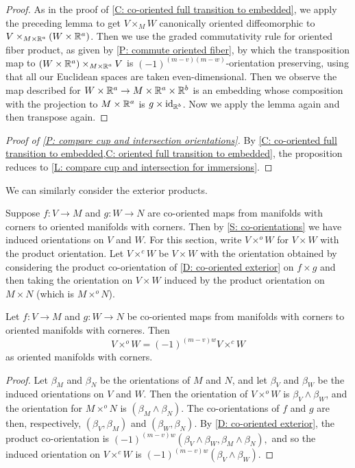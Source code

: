 \begin{proof}
	As in the proof of \cref{C: co-oriented full transition to embedded},
	we apply the preceding lemma to get $V \times_M W$ canonically oriented diffeomorphic to $V\times_{M \times \mathbb{R}^a }(W \times \mathbb{R}^a )$.
	Then we use the graded commutativity rule for oriented fiber product, as given by \cref{P: commute oriented fiber},
	by which
	the transposition map to $(W \times \mathbb{R}^a )\times_{M \times \mathbb{R}^a }V$ is $(-1)^{(m-v)(m-w)}$-orientation preserving, using that all our Euclidean spaces are taken even-dimensional.
	Then we observe the map described for $W \times \mathbb{R}^a \to M \times \mathbb{R}^a \times \mathbb{R}^b $ is an embedding whose composition with the projection to $M \times \mathbb{R}^a $ is $g \times \mathrm{id}_{\mathbb{R}^b }$.
	Now we apply the lemma again and then transpose again.
\end{proof}

\begin{proof}[Proof of \cref{P: compare cup and intersection orientations}]
	By \cref{C: co-oriented full transition to embedded,C: oriented full transition to embedded}, the proposition reduces to \cref{L: compare cup and intersection for immersions}.
\end{proof}

We can similarly consider the exterior products.

Suppose $f \colon V \to M$ and $g \colon W \to N$ are co-oriented maps from manifolds with corners to oriented manifolds with corners.
Then by \cref{S: co-orientations} we have induced orientations on $V$ and $W$.
For this section, write $V \times^o W$ for $V \times W$ with the product orientation.
Let $V \times^c W$ be $V \times W$ with the orientation obtained by considering the product co-orientation of \cref{D: co-oriented exterior} on $f \times g$ and then taking the orientation on $V \times W$ induced by the product orientation on $M \times N$ (which is $M \times^o N$).



\begin{proposition}\label{P: compare exterior orientations}
	Let $f \colon V \to M$ and $g \colon W \to N$ be co-oriented maps from manifolds with corners to oriented manifolds with corneres.
	Then $$V \times^o W = (-1)^{(m-v)w} V \times^c W$$ as oriented manifolds with corners.
\end{proposition}
\begin{proof}
Let $\beta_M$ and $\beta_N$ be the orientations of $M$ and $N$, and let $\beta_V$ and $\beta_W$ be the induced orientations on $V$ and $W$.
Then the orientation of $V \times^o W$ is $\beta_V \wedge \beta_W$, and the orientation for $M \times^o N$ is $(\beta_M \wedge \beta_N)$.
The co-orientations of $f$ and $g$ are then, respectively, $(\beta_V, \beta_M)$ and $(\beta_W, \beta_N)$.
By \cref{D: co-oriented exterior}, the product co-orientation is $(-1)^{(m-v)w}(\beta_V \wedge \beta_W,\beta_M \wedge \beta_N),$ and so the induced orientation on $V \times^c W$ is $(-1)^{(m-v)w}(\beta_V \wedge \beta_W)$.
\end{proof}




